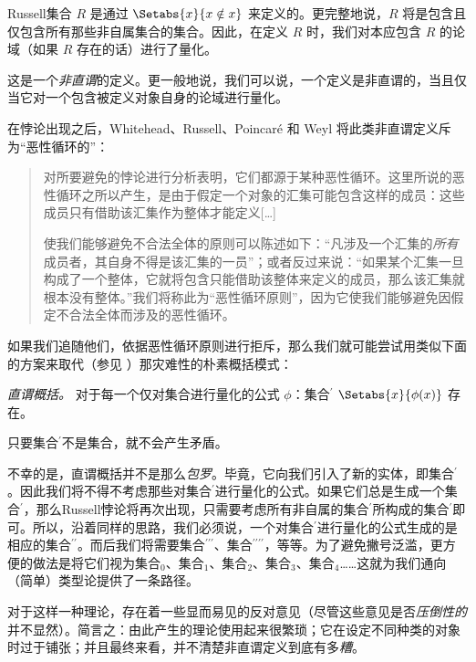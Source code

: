 \documentclass[../../../include/open-logic-section]{subfiles}
\begin{document}


Russell集合 $R$ 是通过 $\Setabs{x}{x \notin x}$ 来定义的。更完整地说，$R$ 将是包含且仅包含所有那些非自属集合的集合。因此，在定义 $R$ 时，我们对本应包含 $R$ 的论域（如果 $R$ 存在的话）进行了量化。

这是一个\emph{非直谓}的定义。更一般地说，我们可以说，一个定义是非直谓的，当且仅当它对一个包含被定义对象自身的论域进行量化。

在悖论出现之后，Whitehead、Russell、Poincaré 和 Weyl 将此类非直谓定义斥为“恶性循环的”：

\begin{quote}
	对所要避免的悖论进行分析表明，它们都源于某种恶性循环。这里所说的恶性循环之所以产生，是由于假定一个对象的汇集可能包含这样的成员：这些成员只有借助该汇集作为整体才能定义[\ldots \textparagraph]

	使我们能够避免不合法全体的原则可以陈述如下：“凡涉及一个汇集的\emph{所有}成员者，其自身不得是该汇集的一员”；或者反过来说：“如果某个汇集一旦构成了一个整体，它就将包含只能借助该整体来定义的成员，那么该汇集就根本没有整体。”我们将称此为“恶性循环原则”，因为它使我们能够避免因假定不合法全体而涉及的恶性循环。
	\citep[p.~37]{WhiteheadRussell1910}
\end{quote}

如果我们追随他们，依据恶性循环原则进行拒斥，那么我们就可能尝试用类似下面的方案来取代（参见 ）那灾难性的朴素概括模式：

\begin{defish}
\emph{直谓概括。} 对于每一个仅对集合进行量化的公式 $\phi$：集合$^\prime$ $\Setabs{x}{\phi(x)}$ 存在。
\end{defish}

只要集合$^{\prime}$不是集合，就不会产生矛盾。

不幸的是，直谓概括并不是那么\emph{包罗}。毕竟，它向我们引入了新的实体，即集合$^\prime$。因此我们将不得不考虑那些对集合$^\prime$进行量化的公式。如果它们总是生成一个集合$^\prime$，那么Russell悖论将再次出现，只需要考虑所有非自属的集合$^\prime$所构成的集合$^\prime$即可。所以，沿着同样的思路，我们必须说，一个对集合$^\prime$进行量化的公式生成的是相应的集合$^{\prime\prime}$。而后我们将需要集合$^{\prime\prime\prime}$、集合$^{\prime\prime\prime\prime}$，等等。为了避免撇号泛滥，更方便的做法是将它们视为集合$_0$、集合$_1$、集合$_2$、集合$_3$、集合$_4$……这就为我们通向（简单）类型论提供了一条路径。

对于这样一种理论，存在着一些显而易见的反对意见（尽管这些意见是否\emph{压倒性的}并不显然）。简言之：由此产生的理论使用起来很繁琐；它在设定不同种类的对象时过于铺张；并且最终来看，并不清楚非直谓定义到底有多\emph{糟}。
\end{document}

